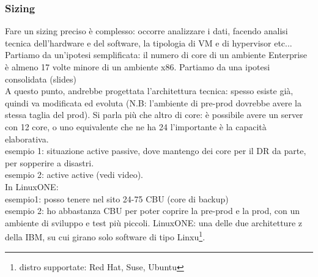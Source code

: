 \documentclass{article}
\begin{document}
\subsubsection{Sizing}
Fare un sizing preciso è complesso: occorre analizzare i dati, facendo analisi tecnica dell'hardware e del software, la tipologia di VM e di hypervisor etc...\\ Partiamo da un'ipotesi semplificata: il numero di core di un ambiente Enterprise è almeno 17 volte minore di un ambiente x86. Partiamo da una ipotesi consolidata (slides)\\ A questo punto, andrebbe progettata l'architettura tecnica: spesso esiste già, quindi va modificata ed evoluta (N.B: l'ambiente di pre-prod dovrebbe avere la stessa taglia del prod). Si parla più che altro di core: è possibile avere un server con 12 core, o uno equivalente che ne ha 24 l'importante è la capacità elaborativa.\\ esempio 1: situazione active passive, dove mantengo dei core per il DR da parte, per sopperire a disastri.\\ esempio 2: active active (vedi video).\\ In LinuxONE: \\ esempio1: posso tenere nel sito 24-75 CBU (core di backup)\\ esempio 2: ho abbastanza CBU per poter coprire la pre-prod e la prod, con un ambiente di sviluppo e test più piccoli. LinuxONE: una delle due architetture z della IBM, su cui girano solo software di tipo Linxu\footnote{distro supportate: Red Hat, Suse, Ubuntu}.
\end{document}
